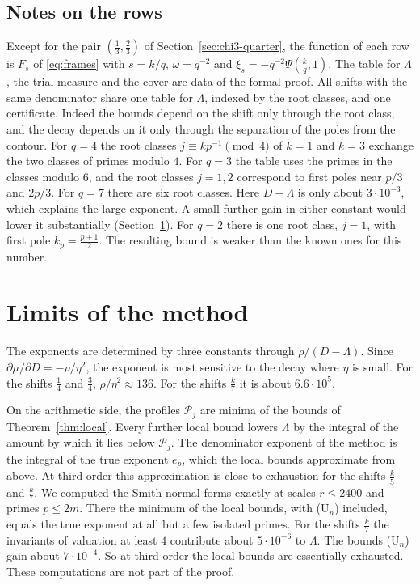 \documentclass[11pt]{amsart}
\theoremstyle{definition}
\theoremstyle{remark}
\numberwithin{equation}{section}
\begin{document}
\subsection{Notes on the rows}\label{sec:families}
Except for the pair $(\frac13,\frac23)$ of Section~\ref{sec:chi3-quarter}, the function of each row is $F_s$ of
\eqref{eq:frames} with $s=k/q$, $\omega=q^{-2}$ and $\xi_s=-q^{-2}\Psi(\frac kq,1)$. The table for $\Lambda$, the trial
measure and the cover are data of the formal proof. All shifts with the same denominator share one table for $\Lambda$,
indexed by the root classes, and one certificate. Indeed the bounds depend on the shift only through the root class, and
the decay depends on it only through the separation of the poles from the contour. For $q=4$ the root classes
$j\equiv kp^{-1}\pmod 4$ of $k=1$ and $k=3$ exchange the two classes of primes modulo $4$. For $q=3$ the table uses the
primes in the classes modulo $6$, and the root classes $j=1,2$ correspond to first poles near $p/3$ and $2p/3$. For $q=7$
there are six root classes. Here $D-\Lambda$ is only about $3\cdot10^{-3}$, which explains the large exponent. A small
further gain in either constant would lower it substantially (Section~\ref{sec:limits}). For $q=2$ there is one root
class, $j=1$, with first pole $k_p=\frac{p+1}2$. The resulting bound is weaker than the known ones for this number.

\section{Limits of the method}\label{sec:limits}

The exponents are determined by three constants through $\rho/(D-\Lambda)$. Since $\partial\mu/\partial D=-\rho/\eta^2$,
the exponent is most sensitive to the decay where $\eta$ is small. For the shifts $\frac14$ and $\frac34$,
$\rho/\eta^2\approx136$. For the shifts $\frac k7$ it is about $6.6\cdot10^5$.

On the arithmetic side, the profiles $\mathcal P_j$ are minima of the bounds of Theorem~\ref{thm:local}. Every further
local bound lowers $\Lambda$ by the integral of the amount by which it lies below $\mathcal P_j$. The denominator exponent of
the method is the integral of the true exponent $e_p$, which the local bounds approximate from above. At third order this
approximation is close to exhaustion for the shifts $\frac k5$ and $\frac k7$. We computed the Smith normal forms exactly
at scales $r\le2400$ and primes $p\le2m$. There the minimum of the local bounds, with (U$_n$) included, equals the true
exponent at all but a few isolated primes. For the shifts $\frac k7$ the invariants of valuation at least $4$ contribute
about $5\cdot10^{-6}$ to $\Lambda$. The bounds (U$_n$) gain about $7\cdot10^{-4}$. So at third order the local bounds are
essentially exhausted. These computations are not part of the proof.
\end{document}
